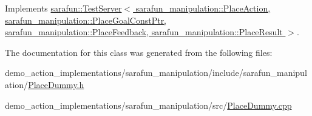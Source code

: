 Implements \hyperlink{classsarafun_1_1TestServer_a85b9721105c2a4b46bae26428433513e}{sarafun\-::\-Test\-Server$<$ sarafun\-\_\-manipulation\-::\-Place\-Action, sarafun\-\_\-manipulation\-::\-Place\-Goal\-Const\-Ptr, sarafun\-\_\-manipulation\-::\-Place\-Feedback, sarafun\-\_\-manipulation\-::\-Place\-Result $>$}.



The documentation for this class was generated from the following files\-:\begin{DoxyCompactItemize}
\item 
demo\-\_\-action\-\_\-implementations/sarafun\-\_\-manipulation/include/sarafun\-\_\-manipulation/\hyperlink{PlaceDummy_8h}{Place\-Dummy.\-h}\item 
demo\-\_\-action\-\_\-implementations/sarafun\-\_\-manipulation/src/\hyperlink{PlaceDummy_8cpp}{Place\-Dummy.\-cpp}\end{DoxyCompactItemize}
